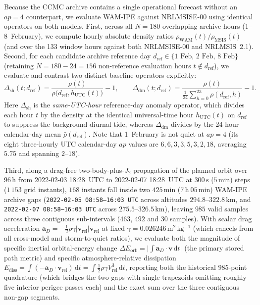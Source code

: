 \documentclass[12pt]{article}
\newcommand{\unit}[1]{\,\mathrm{#1}}
\begin{document}
Because the CCMC archive contains a single operational forecast without an $ap=4$ counterpart, we evaluate WAM-IPE against NRLMSISE-00 using identical operators on both models. First, across all $N=180$ overlapping archive hours (1--8~February), we compute hourly absolute density ratios $\rho_{\mathrm{WAM}}(t)/\rho_{\mathrm{MSIS}}(t)$ (and over the 133 window hours against both NRLMSISE-00 and NRLMSIS~2.1). Second, for each candidate archive reference day $d_{\mathrm{ref}} \in \{\text{1~Feb, 2~Feb, 8~Feb}\}$ (retaining $N = 180 - 24 = 156$ non-reference evaluation hours $t \notin d_{\mathrm{ref}}$), we evaluate and contrast two distinct baseline operators explicitly:
\begin{equation}
\Delta_{\mathrm{sh}}(t; d_{\mathrm{ref}})
  = \frac{\rho(t)}{\rho\bigl(d_{\mathrm{ref}}, h_{\mathrm{UTC}}(t)\bigr)} - 1,
\qquad
\Delta_{\mathrm{dm}}(t; d_{\mathrm{ref}})
  = \frac{\rho(t)}{\frac{1}{24}\sum_{h=0}^{23}\rho(d_{\mathrm{ref}}, h)} - 1.
\label{eq:wam-operators}
\end{equation}
Here $\Delta_{\mathrm{sh}}$ is the \emph{same-UTC-hour} reference-day anomaly operator, which divides each hour $t$ by the density at the identical universal-time hour $h_{\mathrm{UTC}}(t)$ on $d_{\mathrm{ref}}$ to suppress the background diurnal tide, whereas $\Delta_{\mathrm{dm}}$ divides by the 24-hour calendar-day mean $\bar{\rho}(d_{\mathrm{ref}})$. Note that 1~February is not quiet at $ap=4$ (its eight three-hourly UTC calendar-day $ap$ values are $6, 6, 3, 3, 5, 3, 2, 18$, averaging $5.75$ and spanning $2$--$18$).

Third, along a drag-free two-body-plus-$J_2$ propagation of the planned orbit over $96\unit{h}$ from 2022-02-03 18:28~UTC to 2022-02-07 18:28~UTC at $300\unit{s}$ ($5\unit{min}$) steps ($1\,153$ grid instants), $168$ instants fall inside two $425\unit{min}$ ($7\unit{h}\ 05\unit{min}$) WAM-IPE archive gaps (\texttt{2022-02-05 08:58--16:03 UTC} across altitudes $294.8$--$322.8\unit{km}$, and \texttt{2022-02-07 08:58--16:03 UTC} across $275.5$--$326.5\unit{km}$), leaving $985$ valid samples across three contiguous sub-intervals ($463$, $492$ and $30$ samples). With scalar drag acceleration $\mathbf{a}_D = -\tfrac12 \rho \gamma |\mathbf{v}_{\mathrm{rel}}|\mathbf{v}_{\mathrm{rel}}$ at fixed $\gamma = 0.026246\unit{m^2\,kg^{-1}}$ (which cancels from all cross-model and storm-to-quiet ratios), we evaluate both the magnitude of specific inertial orbital-energy change $\Delta E_{\mathrm{orb}} = \bigl|\int \mathbf{a}_D\cdot\mathbf{v}\,\mathrm{d}t\bigr|$ (the primary stored path metric) and specific atmosphere-relative dissipation $E_{\mathrm{diss}} = \int (-\mathbf{a}_D\cdot\mathbf{v}_{\mathrm{rel}})\,\mathrm{d}t = \int \tfrac12\rho\gamma V_{\mathrm{rel}}^3\,\mathrm{d}t$, reporting both the historical $985$-point quadrature (which bridges the two gaps with single trapezoids omitting roughly five interior perigee passes each) and the exact sum over the three contiguous non-gap segments.
\end{document}

